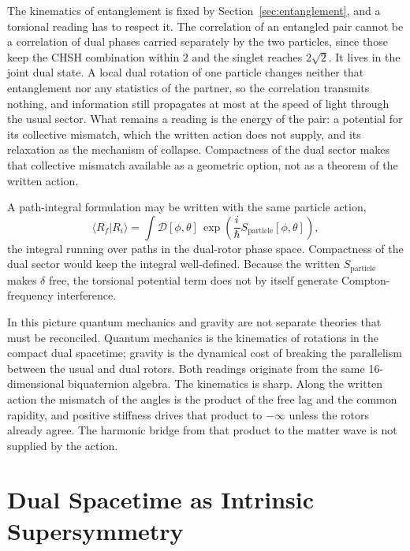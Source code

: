 \documentclass[a4paper]{article}
\begin{document}
The kinematics of entanglement is fixed by Section~\ref{sec:entanglement}, and a torsional reading has to respect it. The correlation of an entangled pair cannot be a correlation of dual phases carried separately by the two particles, since those keep the CHSH combination within $2$ and the singlet reaches $2\sqrt2$. It lives in the joint dual state. A local dual rotation of one particle changes neither that entanglement nor any statistics of the partner, so the correlation transmits nothing, and information still propagates at most at the speed of light through the usual sector. What remains a reading is the energy of the pair: a potential for its collective mismatch, which the written action does not supply, and its relaxation as the mechanism of collapse. Compactness of the dual sector makes that collective mismatch available as a geometric option, not as a theorem of the written action.

A path-integral formulation may be written with the same particle action,
\[
\langle R_f | R_i \rangle = \int \mathcal{D}[\phi,\theta] \, \exp\left( \frac{i}{\hbar} S_\text{particle}[\phi,\theta] \right),
\]
the integral running over paths in the dual-rotor phase space. Compactness of the dual sector would keep the integral well-defined. Because the written $S_{\mathrm{particle}}$ makes $\delta$ free, the torsional potential term does not by itself generate Compton-frequency interference.

In this picture quantum mechanics and gravity are not separate theories that must be reconciled. Quantum mechanics is the kinematics of rotations in the compact dual spacetime; gravity is the dynamical cost of breaking the parallelism between the usual and dual rotors. Both readings originate from the same 16-dimensional biquaternion algebra. The kinematics is sharp. Along the written action the mismatch of the angles is the product of the free lag and the common rapidity, and positive stiffness drives that product to $-\infty$ unless the rotors already agree. The harmonic bridge from that product to the matter wave is not supplied by the action.

\section{Dual Spacetime as Intrinsic Supersymmetry}
\label{sec:susy}
\end{document}
